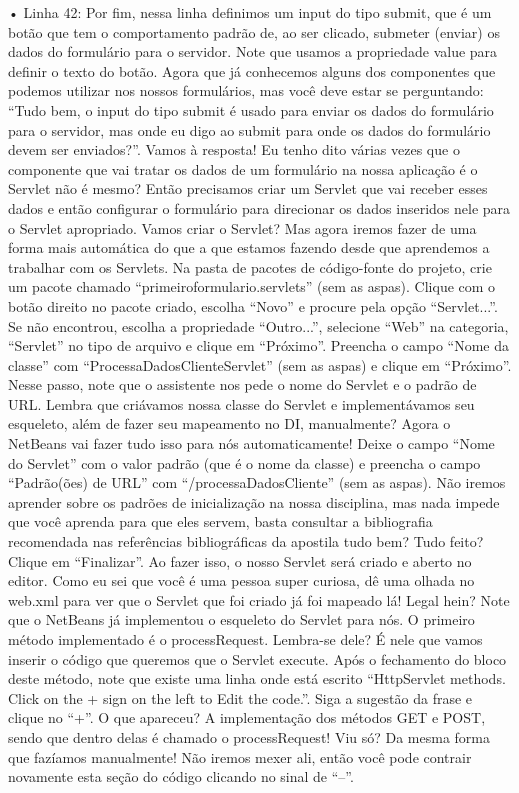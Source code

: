 •	Linha 42: Por fim, nessa linha definimos um input do tipo submit, que é um botão que tem o comportamento padrão de, ao ser clicado, submeter (enviar) os dados do formulário para o servidor. Note que usamos a propriedade value para definir o texto do botão.
Agora que já conhecemos alguns dos componentes que podemos utilizar nos nossos formulários, mas você deve estar se perguntando: “Tudo bem, o input do tipo submit é usado para enviar os dados do formulário para o servidor, mas onde eu digo ao submit para onde os dados do formulário devem ser enviados?”. Vamos à resposta!
Eu tenho dito várias vezes que o componente que vai tratar os dados de um formulário na nossa aplicação é o Servlet não é mesmo? Então precisamos criar um Servlet que vai receber esses dados e então configurar o formulário para direcionar os dados inseridos nele para o Servlet apropriado.
Vamos criar o Servlet? Mas agora iremos fazer de uma forma mais automática do que a que estamos fazendo desde que aprendemos a trabalhar com os Servlets. Na pasta de pacotes de código-fonte do projeto, crie um pacote chamado “primeiroformulario.servlets” (sem as aspas). Clique com o botão direito no pacote criado, escolha “Novo” e procure pela opção “Servlet...”. Se não encontrou, escolha a propriedade “Outro...”, selecione “Web” na categoria, “Servlet” no tipo de arquivo e clique em “Próximo”. 
Preencha o campo “Nome da classe” com “ProcessaDadosClienteServlet” (sem as aspas) e clique em “Próximo”. Nesse passo, note que o assistente nos pede o nome do Servlet e o padrão de URL. Lembra que criávamos nossa classe do Servlet e implementávamos seu esqueleto, além de fazer seu mapeamento no DI, manualmente? Agora o NetBeans vai fazer tudo isso para nós automaticamente! Deixe o campo “Nome do Servlet” com o valor padrão (que é o nome da classe) e preencha o campo “Padrão(ões) de URL” com “/processaDadosCliente” (sem as aspas). Não iremos aprender sobre os padrões de inicialização na nossa disciplina, mas nada impede que você aprenda para que eles servem, basta consultar a bibliografia recomendada nas referências bibliográficas da apostila tudo bem? Tudo feito? Clique em “Finalizar”.
Ao fazer isso, o nosso Servlet será criado e aberto no editor. Como eu sei que você é uma pessoa super curiosa, dê uma olhada no web.xml para ver que o Servlet que foi criado já foi mapeado lá! Legal hein?
Note que o NetBeans já implementou o esqueleto do Servlet para nós. O primeiro método implementado é o processRequest. Lembra-se dele? É nele que vamos inserir o código que queremos que o Servlet execute. Após o fechamento do bloco deste método, note que existe uma linha onde está escrito “HttpServlet methods. Click on the + sign on the left to Edit the code.”. Siga a sugestão da frase e clique no “+”. O que apareceu? A implementação dos métodos GET e POST, sendo que dentro delas é chamado o processRequest! Viu só? Da mesma forma que fazíamos manualmente! Não iremos mexer ali, então você pode contrair novamente esta seção do código clicando no sinal de “–”.
